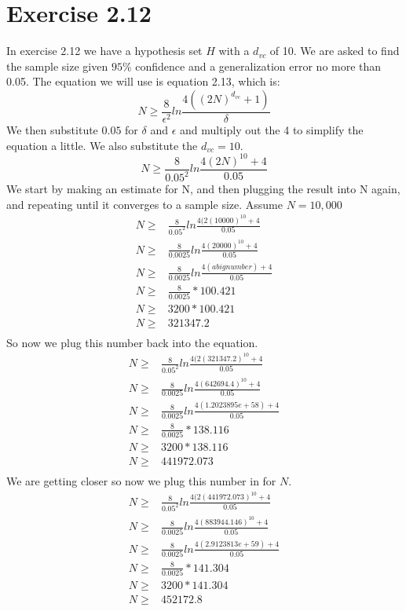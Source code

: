 \documentclass[a4paper]{article}
\begin{document}
\section{Exercise 2.12}
In exercise 2.12 we have a hypothesis set $H$ with a $d_{vc}$ of 10. We are asked to find the sample size given $95\%$ confidence and a generalization error no more than 0.05. The equation we will use is equation 2.13, which is:
\begin{equation}
    N \geq \frac{8}{\epsilon^2}ln\frac{4((2N)^{d_{vc}} + 1)}{\delta}
\end{equation}
We then substitute $0.05$ for $\delta$ and $\epsilon$ and multiply out the 4 to simplify the equation a little. We also substitute the $d_{vc} = 10$.
\begin{equation}
    N \geq \frac{8}{0.05^2}ln\frac{4(2N)^{10} + 4}{0.05}
\end{equation}
We start by making an estimate for N, and then plugging the result into N again, and repeating until it converges to a sample size.
Assume $N=10,000$
\begin{align}
    N \geq & \frac{8}{0.05^2}ln\frac{4(2(10000)^{10} + 4}{0.05}\\
    N \geq & \frac{8}{0.0025}ln\frac{4(20000)^{10} + 4}{0.05}\\
    N \geq & \frac{8}{0.0025}ln\frac{4(a big number) + 4}{0.05}\\
    N \geq & \frac{8}{0.0025} * 100.421\\
    N \geq & 3200 * 100.421\\
    N \geq & 321347.2\\
\end{align}
So now we plug this number back into the equation.
\begin{align}
    N \geq & \frac{8}{0.05^2}ln\frac{4(2(321347.2)^{10} + 4}{0.05}\\
    N \geq & \frac{8}{0.0025}ln\frac{4(642694.4)^{10} + 4}{0.05}\\
    N \geq & \frac{8}{0.0025}ln\frac{4(1.2023895e+58) + 4}{0.05}\\
    N \geq & \frac{8}{0.0025} * 138.116\\
    N \geq & 3200 * 138.116\\
    N \geq & 441972.073\\
\end{align}
We are getting closer so now we plug this number in for $N$.
\begin{align}
    N \geq & \frac{8}{0.05^2}ln\frac{4(2(441972.073)^{10} + 4}{0.05}\\
    N \geq & \frac{8}{0.0025}ln\frac{4(883944.146)^{10} + 4}{0.05}\\
    N \geq & \frac{8}{0.0025}ln\frac{4(2.9123813e+59) + 4}{0.05}\\
    N \geq & \frac{8}{0.0025} * 141.304\\
    N \geq & 3200 * 141.304\\
    N \geq & 452172.8\\
\end{align}
\end{document}

